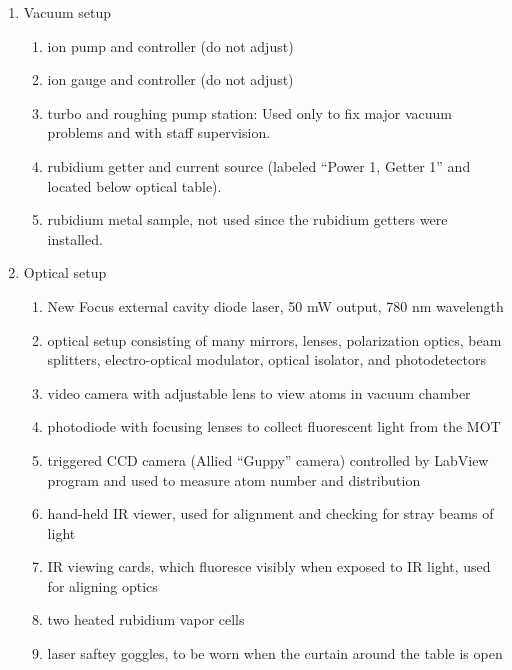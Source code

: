 \documentclass{../lab}
\begin{document}
\begin{enumerate}
    \item Vacuum setup 
    \begin{enumerate}
        \item ion pump and controller (do not adjust)
        \item ion gauge and controller (do not adjust)
        \item turbo and roughing pump station: Used only to fix major vacuum problems and with staff supervision.
        \item rubidium getter and current source (labeled ``Power 1, Getter 1'' and located below optical table).
        \item rubidium metal sample, not used since the rubidium getters were installed.
    \end{enumerate}
    
    \item Optical setup
    \begin{enumerate}
        \item New Focus external cavity diode laser, 50 mW output, 780 nm wavelength
        \item optical setup consisting of many mirrors, lenses, polarization optics, beam splitters, electro-optical modulator, optical isolator, and photodetectors
        \item video camera with adjustable lens to view atoms in vacuum chamber
        \item photodiode with focusing lenses to collect fluorescent light from the MOT
        \item triggered CCD camera (Allied ``Guppy'' camera) controlled by LabView program and used to measure atom number and distribution
        \item hand-held IR viewer, used for alignment and checking for stray beams of light
        \item IR viewing cards, which fluoresce visibly when exposed to IR light, used for aligning optics
        \item two heated rubidium vapor cells
        \item laser saftey goggles, to be worn when the curtain around the table is open
    \end{enumerate}


\end{enumerate}
\end{document}

